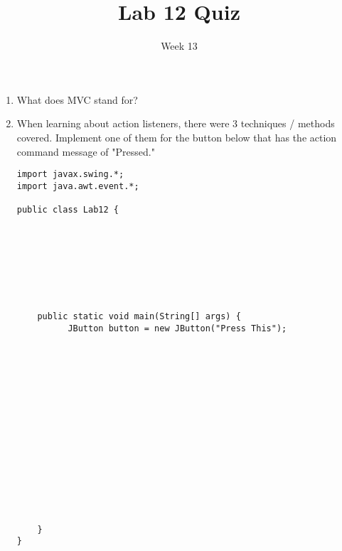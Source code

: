 \documentclass[12pt]{article}
\title{Lab 12 Quiz}
\date{Week 13}
\begin{document}
 

\Instructions

\begin{enumerate}

\item {} 
What does MVC stand for?
\newline

\item {} When learning about action listeners, there were 3 techniques / methods covered. Implement one of them for the button below that has the action command message of "Pressed."

\begin{lstlisting}
import javax.swing.*;
import java.awt.event.*;

public class Lab12 {
    
    
    
    
    
    
    
    
    public static void main(String[] args) {
		  JButton button = new JButton("Press This");	
        
        
        
        
        
        
        
        
        
        
        
        
        
         
        
        
    }
}
	    
	
\end{lstlisting}



\clearpage
\ifdraft \clearpage \fi

\end{enumerate}   
\end{document}
